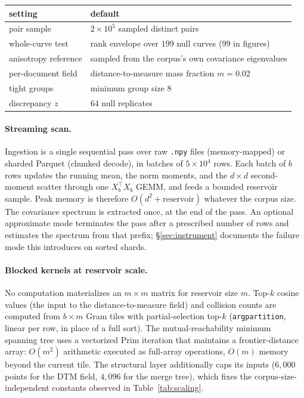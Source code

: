 \documentclass[11pt,letterpaper]{article}
\begin{document}
\begin{center}
\small
\begin{tabular}{ll}
\toprule
setting & default \\
\midrule
pair sample & $2 \times 10^5$ sampled distinct pairs \\
whole-curve test & rank envelope over $199$ null curves ($99$ in figures) \\
anisotropy reference & sampled from the corpus's own covariance eigenvalues \\
per-document field & distance-to-measure mass fraction $m = 0.02$ \\
tight groups & minimum group size $8$ \\
discrepancy $z$ & $64$ null replicates \\
\bottomrule
\end{tabular}
\end{center}

\paragraph{Streaming scan.}
Ingestion is a single sequential pass over raw \texttt{.npy} files
(memory-mapped) or sharded Parquet (chunked decode), in batches of
$5\times10^4$ rows. Each batch of $b$ rows updates the running mean, the
norm moments, and the $d \times d$ second-moment scatter through one
$X_b^{\!\top} X_b$ GEMM, and feeds a bounded reservoir sample. Peak
memory is therefore $O(d^2 + \text{reservoir})$ whatever the corpus
size. The covariance spectrum is extracted once, at the end of the
pass. An optional
approximate mode terminates the pass after a prescribed number of rows and
estimates the spectrum from that prefix; \S\ref{sec:instrument} documents
the failure mode this introduces on sorted shards.

\paragraph{Blocked kernels at reservoir scale.}
No computation materializes an $m \times m$ matrix for reservoir size $m$.
Top-$k$ cosine values (the input to the distance-to-measure field) and
collision counts are computed from $b \times m$ Gram tiles with
partial-selection top-$k$ (\texttt{argpartition}, linear per row, in place
of a full sort). The mutual-reachability minimum spanning tree uses a
vectorized Prim iteration that maintains a frontier-distance array:
$O(m^2)$ arithmetic executed as full-array operations, $O(m)$ memory
beyond the current tile. The structural layer additionally caps its inputs
($6{,}000$ points for the DTM field, $4{,}096$ for the merge tree), which
fixes the corpus-size-independent constants observed in
Table~\ref{tab:scaling}.
\end{document}
